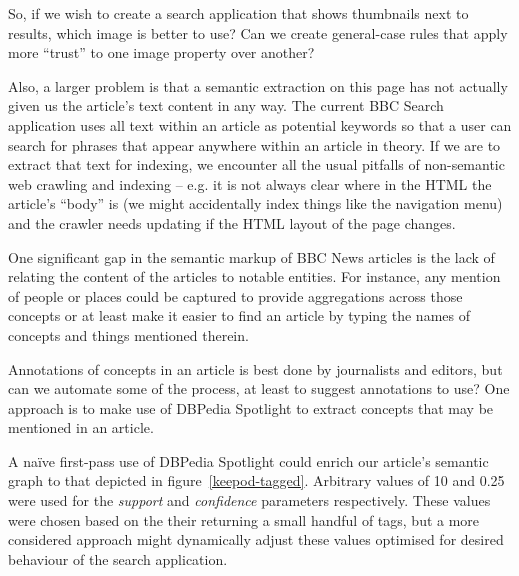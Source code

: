 So, if we wish to create a search application that shows thumbnails next
to results, which image is better to use? Can we create general-case
rules that apply more ``trust'' to one image property over another?

Also, a larger problem is that a semantic extraction on this page
has not actually given us the article's text content in any way. The
current BBC Search application uses all text within an article as
potential keywords so that a user can search for phrases that appear
anywhere within an article in theory. If we are to extract that text
for indexing, we encounter all the usual pitfalls of non-semantic
web crawling and indexing -- e.g. it is not always clear where
in the HTML the article's ``body'' is (we might accidentally index
things like the navigation menu) and the crawler needs updating
if the HTML layout of the page changes.

One significant gap in the semantic markup of BBC News articles is
the lack of relating the content of the articles to notable entities.
For instance, any mention of people or places could be captured
to provide aggregations across those concepts or at least make it
easier to find an article by typing the names of concepts and things
mentioned therein.

Annotations of concepts in an article is best done by journalists
and editors, but can we automate some of the process, at least
to suggest annotations to use? One approach is to make use of
DBPedia Spotlight to extract concepts that may be mentioned in
an article.

\begin{sidewaysfigure}
  \begin{center}
  \end{center}
  \caption{BBC News article page's metadata enriched using DBPedia Spotlight}
  \label{keepod-tagged}
\end{sidewaysfigure}

A na\"ive first-pass use of DBPedia Spotlight could enrich
our article's semantic graph to that depicted in figure~\ref{keepod-tagged}.
Arbitrary values of 10 and 0.25 were used for the \emph{support}
and \emph{confidence} parameters respectively. These values were
chosen based on the their returning a small handful of tags, but
a more considered approach might dynamically adjust these values
optimised for desired behaviour of the search application.

